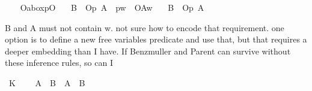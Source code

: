 \begin{isabellebody}
%
\isadelimproof
\ \ %
\endisadelimproof
%
\isatagproof
{}\isamarkupfalse%
%
\endisatagproof
{\isafoldproof}%
%
\isadelimproof
\isanewline
%
\endisadelimproof
{}\isamarkupfalse%
\ Oa{\isacharunderscore}boxpO{\isacharcolon}\isanewline
\ \ \ {\isachardoublequoteopen}{\isasymTurnstile}{\isacharparenleft}B\ \isactrlbold {\isasymrightarrow}\ {\isacharparenleft}{\isacharparenleft}\isactrlbold {\isasymnot}{\isacharparenleft}{\isasymbox}{\isacharparenleft}{\isacharparenleft}O\isactrlsub p\ A{\isacharparenright}\ \isactrlbold {\isasymrightarrow}\ {\isacharparenleft}{\isacharparenleft}{\isasymbox}\isactrlsub pw{\isacharparenright}\ \isactrlbold {\isasymand}\ O{\isacharbraceleft}A{\isacharbar}w{\isacharbraceright}{\isacharparenright}{\isacharparenright}{\isacharparenright}{\isacharparenright}{\isacharparenright}{\isacharparenright}{\isachardoublequoteclose}\isanewline
\ \ \ {\isachardoublequoteopen}{\isasymTurnstile}{\isacharparenleft}B\ \isactrlbold {\isasymrightarrow}\ {\isacharparenleft}\isactrlbold {\isasymnot}{\isacharparenleft}{\isasymdiamond}{\isacharparenleft}O\isactrlsub p\ A{\isacharparenright}{\isacharparenright}{\isacharparenright}{\isacharparenright}{\isachardoublequoteclose}\isanewline
%
\isadelimproof
\ \ %
\endisadelimproof
%
\isatagproof
{}\isamarkupfalse%
\isanewline
%
%
\endisatagproof
{\isafoldproof}%
%
\isadelimproof
%
\endisadelimproof
%
\begin{isamarkuptext}%
B and A must not contain w. not sure how to encode that requirement.
one option is to define a new free variables predicate and use that, but that requires a deeper embedding than I have.
If Benzmuller and Parent can survive without these inference rules, so can I%
\end{isamarkuptext}\isamarkuptrue%
%
\isadelimdocument
%
\endisadelimdocument
%
\isatagdocument
%
\isamarkuptrue%
%
\isamarkuptrue%
%
%
\endisatagdocument
{\isafolddocument}%
%
\isadelimdocument
%
\endisadelimdocument
\isanewline
{}\isamarkupfalse%
\ K{\isacharcolon}\isanewline
\ \ \ {\isachardoublequoteopen}{\isasymTurnstile}\ {\isacharparenleft}{\isacharparenleft}{\isasymbox}{\isacharparenleft}A\ \isactrlbold {\isasymrightarrow}\ B{\isacharparenright}{\isacharparenright}\ \isactrlbold {\isasymrightarrow}\ {\isacharparenleft}{\isacharparenleft}{\isasymbox}A{\isacharparenright}\ \isactrlbold {\isasymrightarrow}\ {\isacharparenleft}{\isasymbox}B{\isacharparenright}{\isacharparenright}{\isacharparenright}{\isachardoublequoteclose}\isanewline

\end{isabellebody}
